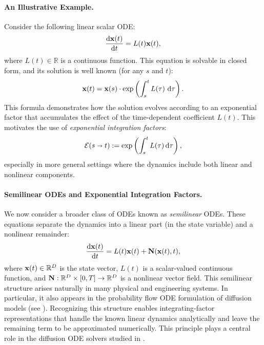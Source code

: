 \paragraph{An Illustrative Example.}
Consider the following linear scalar ODE:
\[
\frac{\mathop{}\!\mathrm{d} {\mathbf{x}}(t)}{\mathop{}\!\mathrm{d} t} = L(t){\mathbf{x}}(t),
\]
where $L(t) \in \mathbb{R}$ is a continuous function. This equation is solvable in closed form, and its solution is well known (for any $s$ and $t$):
\[
{\mathbf{x}}(t) = {\mathbf{x}}(s) \cdot \exp\left( \int_s^t L(\tau) \,\mathop{}\!\mathrm{d} \tau \right).
\]
This formula demonstrates how the solution evolves according to an exponential factor that accumulates the effect of the time-dependent coefficient $L(t)$. This motivates the use of \emph{exponential integration factors}:
\begin{align}\label{eq:exp-int-factor}
    \mathcal{E}(s \shortrightarrow t) := \exp\left( \int_s^t L(\tau)\mathop{}\!\mathrm{d} \tau \right),
\end{align}
especially in more general settings where the dynamics include both linear and nonlinear components.



\paragraph{Semilinear ODEs and Exponential Integration Factors.}
We now consider a broader class of ODEs known as \emph{semilinear} ODEs. These equations separate the dynamics into a linear part (in the state variable) and a nonlinear remainder:
\begin{align}\label{eq:semilinear-ode}
    \frac{\mathop{}\!\mathrm{d} {\mathbf{x}}(t)}{\mathop{}\!\mathrm{d} t} = L(t){\mathbf{x}}(t) + {\mathbf{N}}({\mathbf{x}}(t), t),
\end{align}
where ${\mathbf{x}}(t) \in \mathbb{R}^D$ is the state vector, $L(t)$ is a scalar-valued continuous function, and ${\mathbf{N}}: \mathbb{R}^D \times [0,T] \to \mathbb{R}^D$ is a nonlinear vector field. This semilinear structure arises naturally in many physical and engineering systems. In particular, it also appears in the probability flow ODE formulation of diffusion models (see ). Recognizing this structure enables integrating-factor representations that
handle the known linear dynamics analytically and leave the remaining term to
be approximated numerically. This principle plays a central role in the
diffusion ODE solvers studied in .


